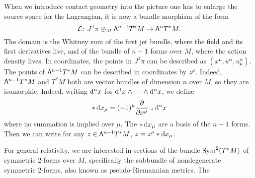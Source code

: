 \documentclass[../main.tex]{subfiles}
\begin{document}
When we introduce contact geometry into the picture one has to enlarge the source space
for the Lagrangian, it is now a bundle morphism of the form
\begin{equation*}
	\mathcal{L} \colon J^1\pi \oplus_M \mathsf{\Lambda}^{n-1}T^\ast M \to \mathsf{\Lambda}^{n} T^\ast M. 
\end{equation*}
The domain is the Whitney sum of the first jet bundle, where the field and its first
derivatives live, and of the bundle of \( n-1 \) forms over \( M \), where the action
density lives. In coordinates, the points in \( J^1\pi \) can be described as \( (x^\mu,
u^\alpha, u^\alpha_\mu) \). The points of \( \mathsf{\Lambda}^{n-1}T^\ast M \) can be described in
coordinates by \( z^\mu \). Indeed, \( \mathsf{\Lambda}^{n-1} T^\ast M \) and \( T^\ast M \) both are
vector bundles of dimension \( n \) over \( M \), so they are isomorphic. Indeed, writing
\( \mathrm{d}^n x \) for \( \mathrm{d}^1x \wedge \cdots \wedge \mathrm{d}^n x \), we define
\begin{equation*}
	\ast \,\mathrm{d} x_\mu = (-1)^\mu \frac{\partial}{\partial x^\mu} \mathbin{\lrcorner} \mathrm{d}^n x
\end{equation*}
where no summation is implied over \( \mu \). The \( \ast \,\mathrm{d} x_\mu \) are a basis of the
\( n-1 \) forms. Then we can write for any \( z \in \mathsf{\Lambda}^{n-1} T^\ast M \), \( z = z^\mu
\ast \mathrm{d} x_\mu \). 

For general relativity, we are interested in sections of the bundle \( \operatorname{Sym}^2(T^\ast M) \)
of symmetric 2-forms over \( M \), specifically the subbundle of nondegenerate symmetric
2-forms, also known as pseudo-Riemannian metrics. The 
\end{document}
